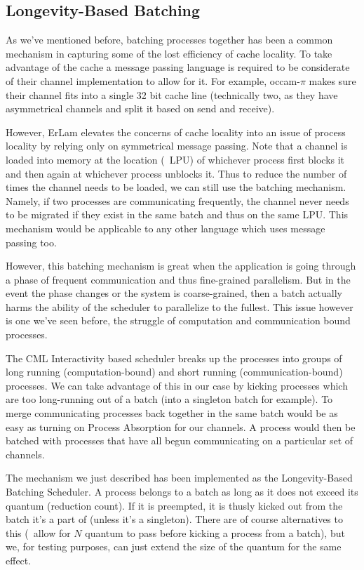 \subsection{Longevity-Based Batching}\label{sec:longevity based batching}

As we've mentioned before, batching processes together has been a common 
mechanism in capturing some of the lost efficiency of cache locality. To take
advantage of the cache a message passing language is required to be considerate 
of their channel implementation to allow for it. For example, occam-$\pi$ makes sure
their channel fits into a single 32 bit cache line (technically two, as they
have asymmetrical channels and split it based on send and receive).

However, ErLam elevates the concerns of cache locality into an issue of process 
locality by relying only on symmetrical message passing. Note that 
a channel is loaded into memory at the location (\ie~LPU) of whichever process 
first blocks it and then again at whichever process unblocks it. Thus to reduce
the number of times the channel needs to be loaded, we can still use the 
batching mechanism. Namely, if two processes are communicating frequently, the
channel never needs to be migrated if they exist in the same batch and thus on the
same LPU. This mechanism would be applicable to any other language which uses 
message passing too.

However, this batching mechanism is great when the application is going through
a phase of frequent communication and thus fine-grained parallelism. But in the
event the phase changes or the system is coarse-grained, then a batch actually
harms the ability of the scheduler to parallelize to the fullest. This issue 
however is one we've seen before, the struggle of computation and communication
bound processes.

The CML Interactivity based scheduler breaks up the processes into groups of
long running (computation-bound) and short running (communication-bound)
processes. We can take advantage of this in our case by kicking processes which
are too long-running out of a batch (into a singleton batch for example). To 
merge communicating processes back together in the same batch would be as easy
as turning on Process Absorption for our channels. A process would then be
batched with processes that have all begun communicating on a particular set
of channels.

The mechanism we just described has been implemented as the Longevity-Based
Batching Scheduler. A process belongs to a batch as long as it does not exceed
its quantum (reduction count). If it is preempted, it is thusly kicked out 
from the batch it's a part of (unless it's a singleton). There are of course
alternatives to this (\eg~allow for $N$ quantum to pass before kicking a 
process from a batch), but we, for testing purposes, can just extend the size
of the quantum for the same effect.

